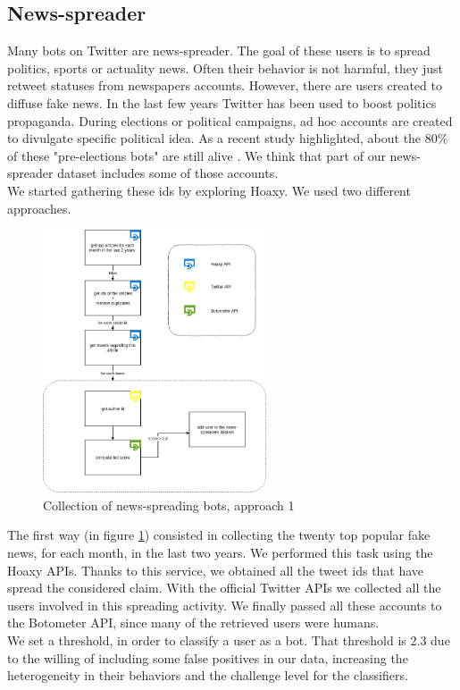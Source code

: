 \subsection{News-spreader}
Many bots on Twitter are news-spreader. The goal of these users is to spread politics, sports or actuality news. Often their behavior is not harmful, they just retweet statuses from newspapers accounts. However, there are users created to diffuse fake news. In the last few years Twitter has been used to boost politics propaganda. During elections or political campaigns, ad hoc accounts are created to divulgate specific political idea.
As a recent study highlighted, about the 80\% of these "pre-elections bots" are still alive \cite{Disinformation}. We think that part of our news-spreader dataset includes some of those accounts.\\We started gathering these ids by exploring Hoaxy.
We used two different approaches.
\begin{figure}
	\centering
	\includegraphics[width=250px]{chapter3/figure/news-spreader.jpg}
	\caption{Collection of news-spreading bots, approach 1}
	\label{fig:news-spreaders}
\end{figure}
The first way (in figure \ref{fig:news-spreaders}) consisted in collecting the twenty top popular fake news, for each month, in the last two years. We performed this task using the Hoaxy APIs. Thanks to this service, we obtained all the tweet ids that have spread the considered claim. With the official Twitter APIs we collected all the users involved in this spreading activity. We finally passed all these accounts to the Botometer API, since many of the retrieved users were humans.\\
We set a threshold, in order to classify a user as a bot. That threshold is 2.3 due to the willing of including some false positives in our data, increasing the heterogeneity in their behaviors and the challenge level for the classifiers.
